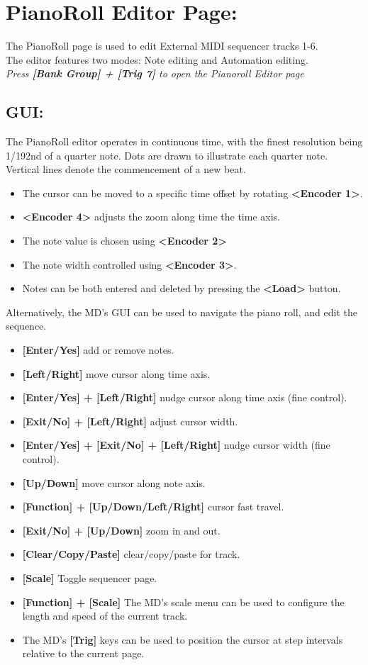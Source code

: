 \chapter{PianoRoll Editor Page:}
The PianoRoll page is used to edit External MIDI sequencer tracks 1-6.\\
The editor features two modes: Note editing and Automation editing.
\\
\textit{Press \textbf{[Bank Group] + [Trig 7]} to open the Pianoroll Editor page}
\section{GUI:}
The PianoRoll editor operates in continuous time, with the finest resolution being 1/192nd of a quarter note. Dots are drawn to illustrate each quarter note. Vertical lines denote the commencement of a new beat.
\newpage
\begin{itemize}
\item The cursor can be moved to a specific time offset by rotating \textbf{<Encoder 1>}. 
\item \textbf{<Encoder 4>} adjusts the zoom along time the time axis.
\item  The note value is chosen using \textbf{<Encoder 2>}
\item The note width controlled using \textbf{<Encoder 3>}. 
\item Notes can be both entered and deleted by pressing the \textbf{<Load>} button.
\end{itemize}
Alternatively, the MD's GUI can be used to navigate the piano roll, and edit the sequence.
\begin{itemize}
     \item \textbf{[Enter/Yes]} add or remove notes.
     \item \textbf{[Left/Right]} move cursor along time axis.
     \item \textbf{[Enter/Yes] + [Left/Right]} nudge cursor along time axis (fine control).
     \item \textbf{[Exit/No] + [Left/Right]} adjust cursor width.
     \item \textbf{[Enter/Yes] + [Exit/No] + [Left/Right]} nudge cursor width (fine control).
     \item \textbf{[Up/Down]} move cursor along note axis.
     \item \textbf{[Function] + [Up/Down/Left/Right]} cursor fast travel.
     \item \textbf{[Exit/No] + [Up/Down]} zoom in and out.
     \item \textbf{[Clear/Copy/Paste]} clear/copy/paste for track.
      \item \textbf{[Scale]} Toggle sequencer page.
     \item \textbf{[Function] + [Scale]} The MD's scale menu can be used to configure the length and speed of the current track.
     \item The MD's \textbf{[Trig]} keys can be used to position the cursor at step intervals relative to the current page.
\end{itemize}
